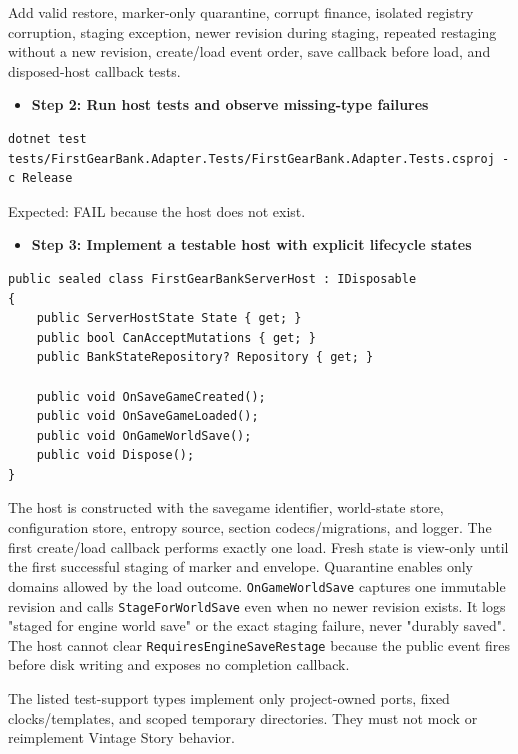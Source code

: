 \documentclass[
  10pt,
  letterpaper,
]{article}
\newcommand{\passthrough}[1]{#1}
\providecommand{\tightlist}{%
  \setlength{\itemsep}{0pt}\setlength{\parskip}{0pt}}
\begin{document}
Add valid restore, marker-only quarantine, corrupt finance, isolated
registry corruption, staging exception, newer revision during staging,
repeated restaging without a new revision, create/load event order, save
callback before load, and disposed-host callback tests.

\begin{itemize}
\tightlist
\item[$\square$]
  \textbf{Step 2: Run host tests and observe missing-type failures}
\end{itemize}

\begin{lstlisting}
dotnet test tests/FirstGearBank.Adapter.Tests/FirstGearBank.Adapter.Tests.csproj -c Release
\end{lstlisting}

Expected: FAIL because the host does not exist.

\begin{itemize}
\tightlist
\item[$\square$]
  \textbf{Step 3: Implement a testable host with explicit lifecycle
  states}
\end{itemize}

\begin{lstlisting}
public sealed class FirstGearBankServerHost : IDisposable
{
    public ServerHostState State { get; }
    public bool CanAcceptMutations { get; }
    public BankStateRepository? Repository { get; }

    public void OnSaveGameCreated();
    public void OnSaveGameLoaded();
    public void OnGameWorldSave();
    public void Dispose();
}
\end{lstlisting}

The host is constructed with the savegame identifier, world-state store,
configuration store, entropy source, section codecs/migrations, and
logger. The first create/load callback performs exactly one load. Fresh
state is view-only until the first successful staging of marker and
envelope. Quarantine enables only domains allowed by the load outcome.
\passthrough{\lstinline!OnGameWorldSave!} captures one immutable
revision and calls \passthrough{\lstinline!StageForWorldSave!} even when
no newer revision exists. It logs "staged for engine world save" or the
exact staging failure, never "durably saved". The host cannot clear
\texttt{RequiresEngineSaveRestage} because the public event fires before
disk writing and exposes no completion callback.

The listed test-support types implement only project-owned ports, fixed
clocks/templates, and scoped temporary directories. They must not mock
or reimplement Vintage Story behavior.
\end{document}
